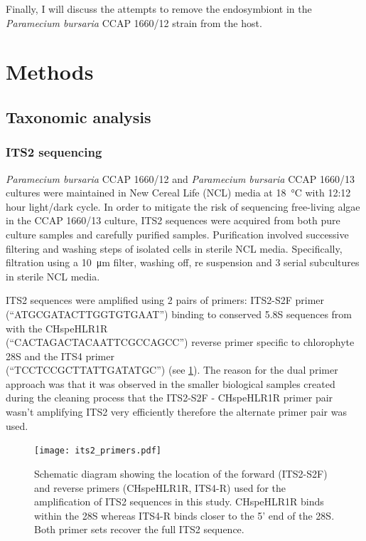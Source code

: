 Finally, I will discuss the attempts to remove the endosymbiont in the 
\textit{Paramecium bursaria} CCAP 1660/12 strain from the host.

\section{Methods}

\subsection{Taxonomic analysis}
    
\subsubsection{ITS2 sequencing}

\textit{Paramecium bursaria} CCAP 1660/12 and \textit{Paramecium bursaria} CCAP 
1660/13 cultures were maintained in New Cereal Life (NCL) media
at \SI{18}{\degreeCelsius} with 12:12 hour light/dark cycle.  In order to mitigate
the risk of sequencing free-living algae in the CCAP 1660/13 culture, ITS2
sequences were acquired from both pure culture samples and carefully purified samples.
Purification involved successive filtering and washing steps of isolated cells in sterile NCL media. 
Specifically, filtration using a \SI{10}{\micro\metre} filter, washing off, re suspension and 3 serial subcultures
in sterile NCL media. 

ITS2 sequences were amplified using 2 pairs of primers: ITS2-S2F primer (``ATGCGATACTTGGTGTGAAT'')
binding to conserved 5.8S sequences from \citep{Chen2010} with the CHspeHLR1R \\
(``CACTAGACTACAATTCGCCAGCC'')
reverse primer specific to chlorophyte 28S \citep{Hoshina2004} and the ITS4 primer \\
(``TCCTCCGCTTATTGATATGC'')
\citep{white1990amplification} (see \cref{fig:its2_primers}).  The reason for the dual primer
approach was that it was observed in the smaller biological samples created during the cleaning
process that the ITS2-S2F - CHspeHLR1R primer pair wasn't amplifying ITS2 very efficiently
therefore the alternate primer pair was used. 

\begin{figure}
    \texttt{[image: its2\_primers.pdf]}
    \caption[ITS2 primer locations]{Schematic diagram showing the location of the forward (ITS2-S2F) and reverse
    primers (CHspeHLR1R, ITS4-R) used for the amplification of ITS2 sequences in this study.
    CHspeHLR1R binds within the 28S whereas ITS4-R binds closer to the 5' end of the 28S.  Both
primer sets recover the full ITS2 sequence.}
    \label{fig:its2_primers}
\end{figure}

